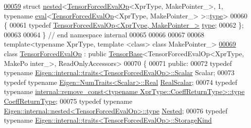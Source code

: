 \begin{DoxyCode}
\hyperlink{struct_eigen_1_1internal_1_1nested_3_01_tensor_forced_eval_op_3_01_xpr_type_00_01_make_pointer__9f18abfe403ccefd01462ad1cf126848}{00059} \textcolor{keyword}{struct }\hyperlink{struct_eigen_1_1internal_1_1nested}{nested}<\hyperlink{class_eigen_1_1_tensor_forced_eval_op}{TensorForcedEvalOp}<XprType, MakePointer\_>, 1, typename 
      \hyperlink{struct_eigen_1_1internal_1_1eval}{eval}<\hyperlink{class_eigen_1_1_tensor_forced_eval_op}{TensorForcedEvalOp}<XprType, MakePointer\_> >::\hyperlink{class_eigen_1_1_tensor_forced_eval_op}{type}>
00060 \{
00061   \textcolor{keyword}{typedef} \hyperlink{class_eigen_1_1_tensor_forced_eval_op}{TensorForcedEvalOp<XprType, MakePointer\_>} 
      \hyperlink{class_eigen_1_1_tensor_forced_eval_op}{type};
00062 \};
00063 
00064 \}  \textcolor{comment}{// end namespace internal}
00065 
00066 
00067 
00068 \textcolor{keyword}{template}<\textcolor{keyword}{typename} XprType, \textcolor{keyword}{template} <\textcolor{keyword}{class}> \textcolor{keyword}{class }MakePointer\_>
\hyperlink{class_eigen_1_1_tensor_forced_eval_op}{00069} \textcolor{keyword}{class }\hyperlink{class_eigen_1_1_tensor_forced_eval_op}{TensorForcedEvalOp} : \textcolor{keyword}{public} \hyperlink{class_eigen_1_1_tensor_base}{TensorBase}<TensorForcedEvalOp<XprType, MakePo
      inter\_>, ReadOnlyAccessors>
00070 \{
00071   \textcolor{keyword}{public}:
00072   \textcolor{keyword}{typedef} \textcolor{keyword}{typename} \hyperlink{struct_eigen_1_1internal_1_1traits}{Eigen::internal::traits<TensorForcedEvalOp>::Scalar}
       Scalar;
00073   \textcolor{keyword}{typedef} \textcolor{keyword}{typename} \hyperlink{group___sparse_core___module}{Eigen::NumTraits<Scalar>::Real} 
      \hyperlink{group___sparse_core___module}{RealScalar};
00074   \textcolor{keyword}{typedef} \textcolor{keyword}{typename} 
      \hyperlink{group___sparse_core___module}{internal::remove\_const<typename XprType::CoeffReturnType>::type}
       \hyperlink{group___sparse_core___module}{CoeffReturnType};
00075   \textcolor{keyword}{typedef} \textcolor{keyword}{typename} \hyperlink{class_eigen_1_1internal_1_1_tensor_lazy_evaluator_writable}{Eigen::internal::nested<TensorForcedEvalOp>::type}
       \hyperlink{class_eigen_1_1internal_1_1_tensor_lazy_evaluator_writable}{Nested};
00076   \textcolor{keyword}{typedef} \textcolor{keyword}{typename} \hyperlink{struct_eigen_1_1internal_1_1traits}{Eigen::internal::traits<TensorForcedEvalOp>::StorageKind}

\end{DoxyCode}
